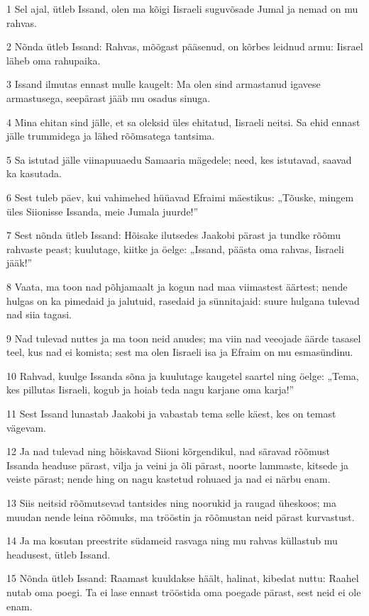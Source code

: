 \par 1 Sel ajal, ütleb Issand, olen ma kõigi Iisraeli suguvõsade Jumal ja nemad on mu rahvas.
\par 2 Nõnda ütleb Issand: Rahvas, mõõgast pääsenud, on kõrbes leidnud armu: Iisrael läheb oma rahupaika.
\par 3 Issand ilmutas ennast mulle kaugelt: Ma olen sind armastanud igavese armastusega, seepärast jääb mu osadus sinuga.
\par 4 Mina ehitan sind jälle, et sa oleksid üles ehitatud, Iisraeli neitsi. Sa ehid ennast jälle trummidega ja lähed rõõmsatega tantsima.
\par 5 Sa istutad jälle viinapuuaedu Samaaria mägedele; need, kes istutavad, saavad ka kasutada.
\par 6 Sest tuleb päev, kui vahimehed hüüavad Efraimi mäestikus: „Tõuske, mingem üles Siionisse Issanda, meie Jumala juurde!”
\par 7 Sest nõnda ütleb Issand: Hõisake ilutsedes Jaakobi pärast ja tundke rõõmu rahvaste peast; kuulutage, kiitke ja öelge: „Issand, päästa oma rahvas, Iisraeli jääk!”
\par 8 Vaata, ma toon nad põhjamaalt ja kogun nad maa viimastest äärtest; nende hulgas on ka pimedaid ja jalutuid, rasedaid ja sünnitajaid: suure hulgana tulevad nad siia tagasi.
\par 9 Nad tulevad nuttes ja ma toon neid anudes; ma viin nad veeojade äärde tasasel teel, kus nad ei komista; sest ma olen Iisraeli isa ja Efraim on mu esmasündinu.
\par 10 Rahvad, kuulge Issanda sõna ja kuulutage kaugetel saartel ning öelge: „Tema, kes pillutas Iisraeli, kogub ja hoiab teda nagu karjane oma karja!”
\par 11 Sest Issand lunastab Jaakobi ja vabastab tema selle käest, kes on temast vägevam.
\par 12 Ja nad tulevad ning hõiskavad Siioni kõrgendikul, nad säravad rõõmust Issanda headuse pärast, vilja ja veini ja õli pärast, noorte lammaste, kitsede ja veiste pärast; nende hing on nagu kastetud rohuaed ja nad ei närbu enam.
\par 13 Siis neitsid rõõmutsevad tantsides ning noorukid ja raugad üheskoos; ma muudan nende leina rõõmuks, ma trööstin ja rõõmustan neid pärast kurvastust.
\par 14 Ja ma kosutan preestrite südameid rasvaga ning mu rahvas küllastub mu headusest, ütleb Issand.
\par 15 Nõnda ütleb Issand: Raamast kuuldakse häält, halinat, kibedat nuttu: Raahel nutab oma poegi. Ta ei lase ennast trööstida oma poegade pärast, sest neid ei ole enam.
